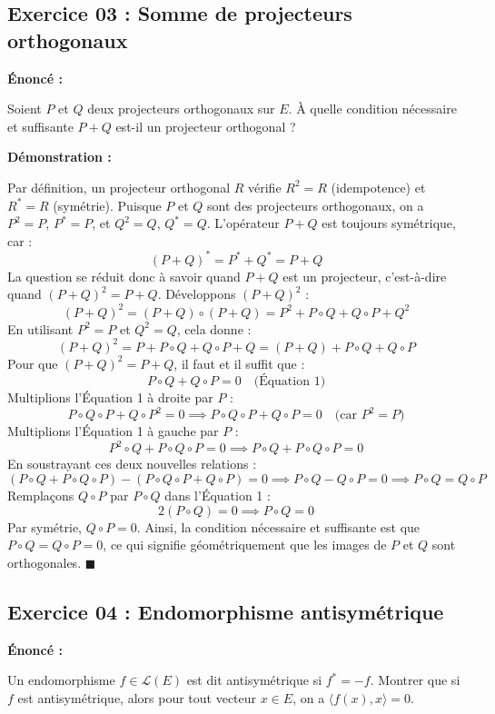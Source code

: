 \documentclass[11pt,a4paper]{article}
\begin{document}
\subsection*{Exercice 03 : Somme de projecteurs orthogonaux}


\textbf{Énoncé :}


Soient $P$ et $Q$ deux projecteurs orthogonaux sur $E$. À quelle condition nécessaire et suffisante $P+Q$ est-il un projecteur orthogonal ?

\textbf{Démonstration :}


Par définition, un projecteur orthogonal $R$ vérifie $R^2 = R$ (idempotence) et $R^* = R$ (symétrie).
Puisque $P$ et $Q$ sont des projecteurs orthogonaux, on a $P^2=P$, $P^*=P$, et $Q^2=Q$, $Q^*=Q$.
L'opérateur $P+Q$ est toujours symétrique, car :
$$ (P+Q)^* = P^* + Q^* = P + Q $$
La question se réduit donc à savoir quand $P+Q$ est un projecteur, c'est-à-dire quand $(P+Q)^2 = P+Q$.
Développons $(P+Q)^2$ :
$$ (P+Q)^2 = (P+Q) \circ (P+Q) = P^2 + P \circ Q + Q \circ P + Q^2 $$
En utilisant $P^2=P$ et $Q^2=Q$, cela donne :
$$ (P+Q)^2 = P + P \circ Q + Q \circ P + Q = (P+Q) + P \circ Q + Q \circ P $$
Pour que $(P+Q)^2 = P+Q$, il faut et il suffit que :
$$ P \circ Q + Q \circ P = 0 \quad \text{(Équation 1)} $$
Multiplions l'Équation 1 à droite par $P$ :
$$ P \circ Q \circ P + Q \circ P^2 = 0 \implies P \circ Q \circ P + Q \circ P = 0 \quad \text{(car } P^2=P) $$
Multiplions l'Équation 1 à gauche par $P$ :
$$ P^2 \circ Q + P \circ Q \circ P = 0 \implies P \circ Q + P \circ Q \circ P = 0 $$
En soustrayant ces deux nouvelles relations :
$$ (P \circ Q + P \circ Q \circ P) - (P \circ Q \circ P + Q \circ P) = 0 \implies P \circ Q - Q \circ P = 0 \implies P \circ Q = Q \circ P $$
Remplaçons $Q \circ P$ par $P \circ Q$ dans l'Équation 1 :
$$ 2(P \circ Q) = 0 \implies P \circ Q = 0 $$
Par symétrie, $Q \circ P = 0$.
Ainsi, la condition nécessaire et suffisante est que $P \circ Q = Q \circ P = 0$, ce qui signifie géométriquement que les images de $P$ et $Q$ sont orthogonales. $\blacksquare$

\subsection*{Exercice 04 : Endomorphisme antisymétrique}


\textbf{Énoncé :}


Un endomorphisme $f \in \mathcal{L}(E)$ est dit antisymétrique si $f^* = -f$. Montrer que si $f$ est antisymétrique, alors pour tout vecteur $x \in E$, on a $\langle f(x), x \rangle = 0$.
\end{document}
